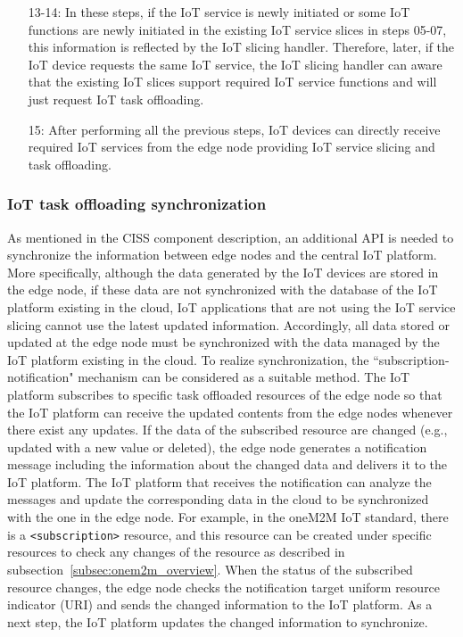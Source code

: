 \begin{enumerate}
\item [13-14:] In these steps, if the IoT service is newly initiated or some IoT functions are newly initiated in the existing IoT service slices in steps 05-07, this information is reflected by the IoT slicing handler. Therefore, later, if the IoT device requests the same IoT service, the IoT slicing handler can aware that the existing IoT slices support required IoT service functions and will just request IoT task offloading.

\item [15:] After performing all the previous steps, IoT devices can directly receive required IoT services from the edge node providing IoT service slicing and task offloading.
\end{enumerate}

\subsubsection{IoT task offloading synchronization} As mentioned in the CISS component description, an additional API is needed to synchronize the information between edge nodes and the central IoT platform. 
More specifically, although the data generated by the IoT devices are stored in the edge node, if these data are not synchronized with the database of the IoT platform existing in the cloud, IoT applications that are not using the IoT service slicing cannot use the latest updated information. 
Accordingly, all data stored or updated at the edge node must be synchronized with the data managed by the IoT platform existing in the cloud. 
To realize synchronization, the ``subscription-notification" mechanism can be considered as a suitable method. 
The IoT platform subscribes to specific task offloaded resources of the edge node so that the IoT platform can receive the updated contents from the edge nodes whenever there exist any updates. 
If the data of the subscribed resource are changed (e.g., updated with a new value or deleted), the edge node generates a notification message including the information about the changed data and delivers it to the IoT platform. 
The IoT platform that receives the notification can analyze the messages and update the corresponding data in the cloud to be synchronized with the one in the edge node. 
For example, in the oneM2M IoT standard, there is a \texttt{<subscription>} resource, and this resource can be created under specific resources to check any changes of the resource as described in subsection~\ref{subsec:onem2m_overview}.
When the status of the subscribed resource changes, the edge node checks the notification target uniform resource indicator (URI) and sends the changed information to the IoT platform. 
As a next step, the IoT platform updates the changed information to synchronize.

